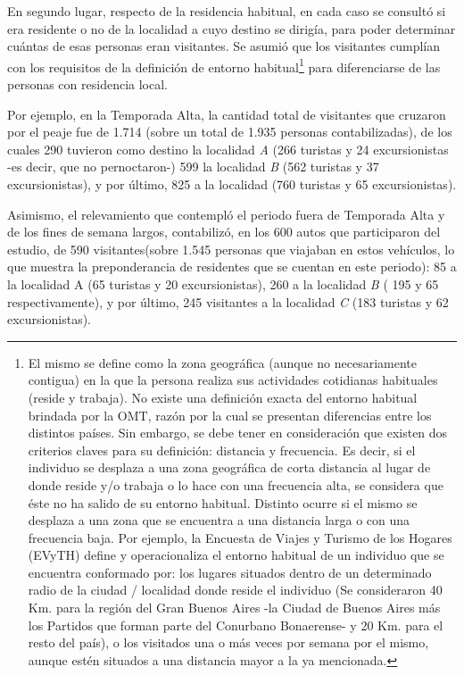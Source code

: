 \documentclass[
]{book}
\begin{document}
En segundo lugar, respecto de la residencia habitual, en cada caso se consultó si era residente o no de la localidad a cuyo destino se dirigía, para poder determinar cuántas de esas personas eran visitantes. Se asumió que los visitantes cumplían con los requisitos de la definición de entorno habitual\footnote{El mismo se define como la zona geográfica (aunque no necesariamente contigua) en la que la persona realiza sus actividades cotidianas habituales (reside y trabaja). No existe una definición exacta del entorno habitual brindada por la OMT, razón por la cual se presentan diferencias entre los distintos países. Sin embargo, se debe tener en consideración que existen dos criterios claves para su definición: distancia y frecuencia. Es decir, si el individuo se desplaza a una zona geográfica de corta distancia al lugar de donde reside y/o trabaja o lo hace con una frecuencia alta, se considera que éste no ha salido de su entorno habitual. Distinto ocurre si el mismo se desplaza a una zona que se encuentra a una distancia larga o con una frecuencia baja. Por ejemplo, la Encuesta de Viajes y Turismo de los Hogares (EVyTH) define y operacionaliza el entorno habitual de un individuo que se encuentra conformado por: los lugares situados dentro de un determinado radio de la ciudad / localidad donde reside el individuo (Se consideraron 40 Km. para la región del Gran Buenos Aires -la Ciudad de Buenos Aires más los Partidos que forman parte del Conurbano Bonaerense- y 20 Km. para el resto del país), o los visitados una o más veces por semana por el mismo, aunque estén situados a una distancia mayor a la ya mencionada.} para diferenciarse de las personas con residencia local.

Por ejemplo, en la Temporada Alta, la cantidad total de visitantes que cruzaron por el peaje fue de 1.714 (sobre un total de 1.935 personas contabilizadas), de los cuales 290 tuvieron como destino la localidad \emph{A} (266 turistas y 24 excursionistas -es decir, que no pernoctaron-) 599 la localidad \emph{B} (562 turistas y 37 excursionistas), y por último, 825 a la localidad (760 turistas y 65 excursionistas).

Asimismo, el relevamiento que contempló el periodo fuera de Temporada Alta y de los fines de semana largos, contabilizó, en los 600 autos que participaron del estudio, de 590 visitantes(sobre 1.545 personas que viajaban en estos vehículos, lo que muestra la preponderancia de residentes que se cuentan en este periodo): 85 a la localidad A (65 turistas y 20 excursionistas), 260 a la localidad \emph{B} ( 195 y 65 respectivamente), y por último, 245 visitantes a la localidad \emph{C} (183 turistas y 62 excursionistas).
\end{document}
